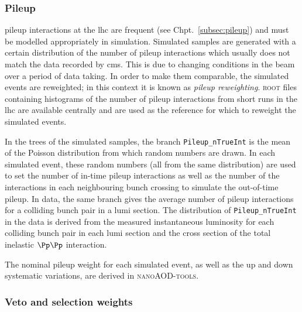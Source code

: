 

\subsubsection{Pileup}
\label{subsubsec:pu_reweighting}

\Gls{pileup} interactions at the \acrshort{lhc} are frequent (see Chpt.~\ref{subsec:pileup}) and must be modelled appropriately in simulation. Simulated samples are generated with a certain distribution of the number of \gls{pileup} interactions which usually does not match the data recorded by \acrshort{cms}. This is due to changing conditions in the beam over a period of data taking. In order to make them comparable, the simulated events are reweighted; in this context it is known as \emph{\gls{pileup} reweighting}. \textsc{root} files containing histograms of the number of \gls{pileup} interactions from short runs in the \acrshort{lhc} are available centrally and are used as the reference for which to reweight the simulated events.

In the trees of the simulated samples, the branch \texttt{Pileup\_nTrueInt} is the mean of the Poisson distribution from which random numbers are drawn. In each simulated event, these random numbers (all from the same distribution) are used to set the number of in-time \gls{pileup} interactions as well as the number of the interactions in each neighbouring bunch crossing to simulate the out-of-time \gls{pileup}. In data, the same branch gives the average number of \gls{pileup} interactions for a colliding bunch pair in a lumi section. The distribution of \texttt{Pileup\_nTrueInt} in the data is derived from the measured instantaneous luminosity for each colliding bunch pair in each lumi section and the cross section of the total inelastic $\Pp\Pp$ interaction.

The nominal \gls{pileup} weight for each simulated event, as well as the up and down systematic variations, are derived in \textsc{nanoAOD-tools}. %




\subsubsection{Veto and selection weights}
\label{subsubsec:veto_sel_weights}

